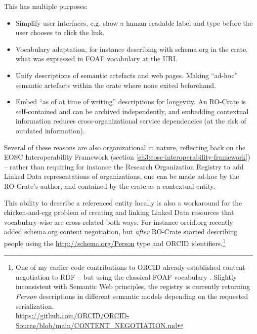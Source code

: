 This has multiple purposes:

\begin{itemize}
    \item Simplify user interfaces, e.g. show a human-readable label and type before the user chooses to click the link.
    \item Vocabulary adaptation, for instance describing with schema.org in the crate, what was expressed in FOAF vocabulary at the URI.
    \item Unify descriptions of semantic artefacts and web pages. 
          Making ``ad-hoc'' semantic artefacts within the crate where none exited beforehand.
    \item Embed ``as of at time of writing'' descriptions for longevity. 
          An RO-Crate is self-contained and can be archived independently, and embedding contextual information reduces cross-organizational service dependencies (at the risk of outdated information).
\end{itemize}

Several of these reasons are also organizational in nature, reflecting back on the EOSC Interoperability Framework (section \vref{ch3:eosc-interoperability-framework}) -- rather than requiring for instance the Research Organization Registry  to add Linked Data representations of organizations, one can be made ad-hoc by the RO-Crate's author, and contained by the crate as a contextual entity. 

This ability to describe a referenced entity locally is also a workaround for the chicken-and-egg problem of creating and linking Linked Data resources that vocabulary-wise are cross-related both ways. For instance orcid.org recently added schema.org content negotiation, but \emph{after} RO-Crate started describing people using the \url{http://schema.org/Person} type and ORCID identifiers.\footnote{
  One of my earlier code contributions to ORCID already established content-negotiation to RDF -- but using the classical FOAF vocabulary \cite{FOAFVocabularySpecification}.
  Slightly inconsistent with Semantic Web principles\footnotemark, the registry is currently returning \emph{Person} descriptions in different semantic models depending on the requested serialization. \\
  \url{https://github.com/ORCID/ORCID-Source/blob/main/CONTENT_NEGOTIATION.md}} 


